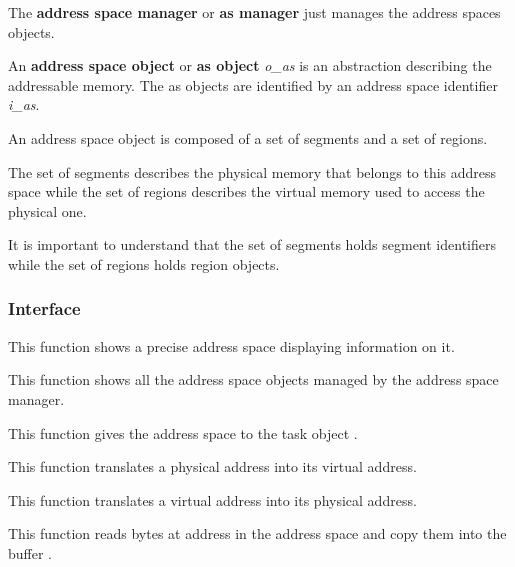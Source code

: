 The \textbf{address space manager} or \textbf{as manager} just manages
the address spaces objects.

An \textbf{address space object} or \textbf{as object} \textit{o\_as}
is an abstraction describing the addressable memory. The as objects
are identified by an address space identifier \textit{i\_as}.

An address space object is composed of a set of segments and a set of regions.

The set of segments describes the physical memory that belongs to this
address space while the set of regions describes the virtual memory
used to access the physical one.

It is important to understand that the set of segments holds segment
identifiers while the set of regions holds region objects.

%
%

\subsubsection{Interface}

	 {
	   This function shows a precise address space displaying
	   information on it.
	 }

	 {
	   This function shows all the address space objects managed by
	   the address space manager.
	 }

	 {
	   This function gives the address space  to the
	   task object .
	 }

	 {
	   This function translates a physical address into its virtual
	   address.
	 }

	 {
	   This function translates a virtual address into its physical
	   address.
	 }

	 {
	   This function reads  bytes at address
	    in the address space  and
	   copy them into the buffer .
	 }


